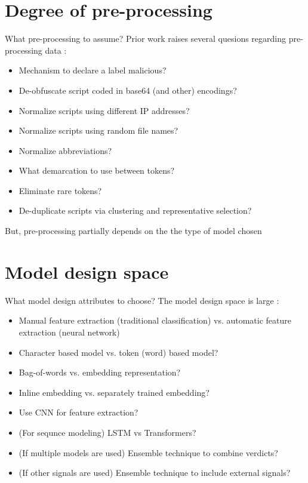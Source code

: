 \documentclass[10pt]{beamer}
\begin{document}
\section{Degree of pre-processing}

\begin{frame}[fragile]{What pre-processing to assume?}
	Prior work raises several quesions regarding pre-processing data \cite{powershell2018,amsi2019,feye2018}:
	\begin{itemize}
		\item Mechanism to declare a label malicious?
		\item De-obfuscate script coded in base64 (and other) encodings?
		\item Normalize scripts using different IP addresses?
		\item Normalize scripts using random file names?
		\item Normalize abbreviations?
		\item What demarcation to use between tokens?
		\item Eliminate rare tokens?
		\item De-duplicate scripts via clustering and representative selection?
	\end{itemize}
	But, pre-processing partially depends on the the type of model chosen
\end{frame}

\section{Model design space}

\begin{frame}[fragile]{What model design attributes to choose?}
	The model design space is large \cite{survey2021,msft2017,powershell2018,amsi2019,feye2018,feye2018-2,textcnn2016,textcnn2019}:
	\begin{itemize}
		\item Manual feature extraction (traditional classification) vs. automatic feature extraction (neural network)
		\item Character based model vs. token (word) based model?
		\item Bag-of-words vs. embedding representation?
		\item Inline embedding vs. separately trained embedding?
		\item Use CNN for feature extraction?
		\item (For sequnce modeling) LSTM vs Transformers? 
		\item (If multiple models are used) Ensemble technique to combine verdicts?
		\item (If other signals are used) Ensemble technique to include external signals?
	\end{itemize}
\end{frame}
\end{document}
